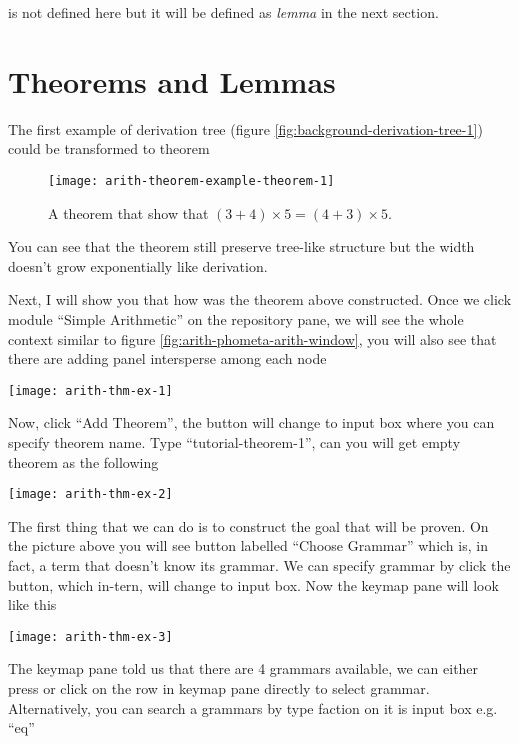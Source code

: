 \documentclass[master.tex]{subfiles}
\begin{document}
 is not defined here but it will be defined as \emph{lemma}
in the next section.

\section{Theorems and Lemmas}

The first example of derivation tree (figure
\ref{fig:background-derivation-tree-1}) could be transformed to theorem

\begin{figure}[H]
    \centering
\begin{minipage}{0.8\textwidth}
    \texttt{[image: arith-theorem-example-theorem-1]}
\end{minipage}
\caption{A theorem that show that $(3 + 4) \times 5 = (4 + 3) \times 5$.}
\label{fig:arith-theorem-example-theorem-1}
\end{figure}

You can see that the theorem still preserve tree-like structure but the width
doesn't grow exponentially like derivation.

Next, I will show you that how was the theorem above constructed. Once we click
module ``Simple Arithmetic'' on the repository pane, we will see the whole
context similar to figure \ref{fig:arith-phometa-arith-window}, you will also
see that there are adding panel intersperse among each node

\texttt{[image: arith-thm-ex-1]}

Now, click ``Add Theorem'', the button will change to input box where you can
specify theorem name. Type ``tutorial-theorem-1'', can you will get empty
theorem as the following

\texttt{[image: arith-thm-ex-2]}

The first thing that we can do is to construct the goal that will be proven. On
the picture above you will see button labelled ``Choose Grammar'' which is, in
fact, a term that doesn't know its grammar. We can specify grammar by click the
button, which in-tern, will change to input box. Now the keymap pane will look
like this

\begin{center}
\texttt{[image: arith-thm-ex-3]}
\end{center}

The keymap pane told us that there are 4 grammars available, we can either press
 or click on the row in keymap pane directly to select grammar.
Alternatively, you can search a grammars by type faction on it is input box e.g.
``eq''
\end{document}
